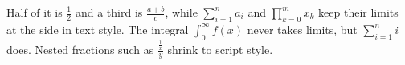 \documentclass{article}
\begin{document}
Half of it is $\frac{1}{2}$ and a third is $\frac{a+b}{c}$, while
$\sum_{i=1}^n a_i$ and $\prod_{k=0}^{m} x_k$ keep their limits at the side in
text style. The integral $\int_0^\infty f(x)$ never takes limits, but
$\sum\limits_{i=1}^n i$ does. Nested fractions such as $\frac{\frac{1}{x}}{y}$
shrink to script style.
\end{document}
